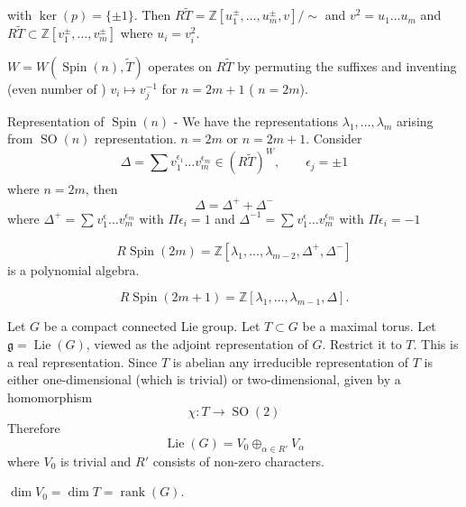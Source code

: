\documentclass[11pt,a4paper]{scrarticle}
\theoremstyle{definition}
\theoremstyle{greenbox}
\newcommand{\Z}{\mathbb{Z}}
\newcommand{\fg}{\mathfrak{g}}
\begin{document}
with $ \ker(p) = \{\pm 1\} $. Then $ R \tilde{T} = \Z[u_{1}^{\pm}, \dots, u_{m}^{\pm}, v] / \sim $ and $ v^{2} = u_{1} \dots u_{m} $ and $ R \tilde{T} \subset \Z [v_{1}^{\pm}, \dots, v_{m}^{\pm}] $ where $ u_{i} = v_{i}^{2} $. 

$ W = W( \operatorname{Spin}(n), \tilde{T}) $ operates on $ R \tilde{T} $ by permuting the suffixes and inventing (even number of ) $ v_{i} \mapsto v_{j}^{-1} $ for $ n = 2m+1 $ ( $ n = 2m $). 

Representation of $ \operatorname{Spin}(n) $  - We have the representations $ \lambda_{1}, \dots, \lambda_{m} $ arising from $ \operatorname{SO}(n) $ representation. $ n = 2m $ or $ n = 2m+1 $. Consider 
\[ \Delta = \sum_{}^{} v_{1}^{\epsilon_{1}} \dots v_{m}^{\epsilon_{m}}   \in (R \tilde{T})^{W}, \qquad \epsilon_{j} = \pm 1\]
where $ n = 2m $, then 
\[ \Delta = \Delta^{+} + \Delta^{-} \]
where $ \Delta^{+} = \sum_{}^{} v_{1}^{\epsilon} \dots v_{m}^{\epsilon_{m}}  $ with $ \Pi \epsilon_{i} = 1 $ and $ \Delta^{-1}  = \sum_{}^{} v_{1}^{\epsilon} \dots v_{m}^{\epsilon_{m}}  $ with $ \Pi \epsilon_{i} = -1 $
 
\begin{thm}
    $$ R \operatorname{Spin}(2m) = \Z [\lambda_{1}, \dots, \lambda_{m-2}, \Delta^{+}, \Delta^{-}] $$ is a polynomial algebra. 


    $$ R \operatorname{Spin}(2m+1)  = \Z[ \lambda_{1}, \dots, \lambda_{m-1}, \Delta]. $$ 
\end{thm}


Let $ G $ be a compact connected Lie group. Let $ T \subset G $ be a maximal torus. Let $ \fg = \operatorname{Lie}(G) $, viewed as the adjoint representation of $ G $. Restrict it to $ T $. This is a real representation. Since $ T $ is abelian any irreducible representation of $ T $ is either one-dimensional (which is trivial) or two-dimensional, given by a homomorphism 
\[ \chi : T \to \operatorname{SO}(2) \]
Therefore 
\[ \operatorname{Lie}(G) = V_{0} \oplus_{\alpha \in R'} V_{\alpha}  \]
where $ V_{0}  $ is trivial and $ R' $ consists of non-zero characters.

\begin{lemma}
    $ \dim V_{0} = \dim T = \operatorname{rank}(G) $. 
\end{lemma}
\end{document}
